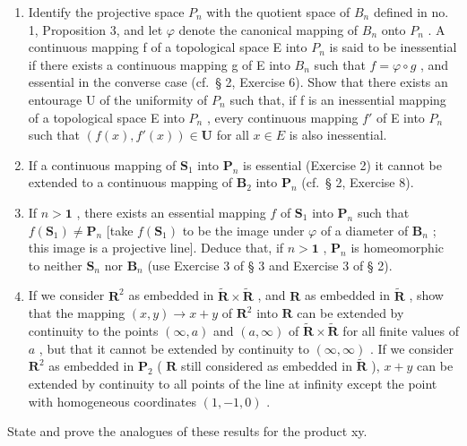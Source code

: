 \begin{enumerate}
\def\labelenumi{\arabic{enumi})}
\setcounter{enumi}{1}
\item
  Identify the projective space \(P_{n}\) with the quotient space of \(B_{n}\) defined in no. 1, Proposition 3, and let \(\varphi\) denote the canonical mapping of \(B_{n}\) onto \(P_{n}\) . A continuous mapping f of a topological space E into \(P_{n}\) is said to be inessential if there exists a continuous mapping g of E into \(B_{n}\) such that \(f = \varphi \circ g\) , and essential in the converse case (cf.~§ 2, Exercise 6). Show that there exists an entourage U of the uniformity of \(P_{n}\) such that, if f is an inessential mapping of a topological space E into \(P_{n}\) , every continuous mapping \(f'\) of E into \(P_{n}\) such that \((f(x), f'(x)) \in \mathbf{U}\) for all \(x \in E\) is also inessential.
\item
  If a continuous mapping of \(\mathbf{S}_1\) into \(\mathbf{P}_n\) is essential (Exercise 2) it cannot be extended to a continuous mapping of \(\mathbf{B}_2\) into \(\mathbf{P}_n\) (cf.~§ 2, Exercise 8).
\item
  If \(n > \mathbf{1}\) , there exists an essential mapping \(f\) of \(\mathbf{S}_1\) into \(\mathbf{P}_n\) such that \(f(\mathbf{S}_1) \neq \mathbf{P}_n\) {[}take \(f(\mathbf{S}_1)\) to be the image under \(\varphi\) of a diameter of \(\mathbf{B}_n\) ; this image is a projective line{]}. Deduce that, if \(n > \mathbf{1}\) , \(\mathbf{P}_n\) is homeomorphic to neither \(\mathbf{S}_n\) nor \(\mathbf{B}_n\) (use Exercise 3 of § 3 and Exercise 3 of § 2).
\item
  If we consider \(\mathbf{R}^2\) as embedded in \(\tilde{\mathbf{R}} \times \tilde{\mathbf{R}}\) , and \(\mathbf{R}\) as embedded in \(\tilde{\mathbf{R}}\) , show that the mapping \((x, y) \to x + y\) of \(\mathbf{R}^2\) into \(\mathbf{R}\) can be extended by continuity to the points \((\infty, a)\) and \((a, \infty)\) of \(\tilde{\mathbf{R}} \times \tilde{\mathbf{R}}\) for all finite values of \(a\) , but that it cannot be extended by continuity to \((\infty, \infty)\) . If we consider \(\mathbf{R}^2\) as embedded in \(\mathbf{P}_2\) ( \(\mathbf{R}\) still considered as embedded in \(\tilde{\mathbf{R}}\) ), \(x + y\) can be extended by continuity to all points of the line at infinity except the point with homogeneous coordinates \((1, -1, 0)\) .
\end{enumerate}

State and prove the analogues of these results for the product xy.

